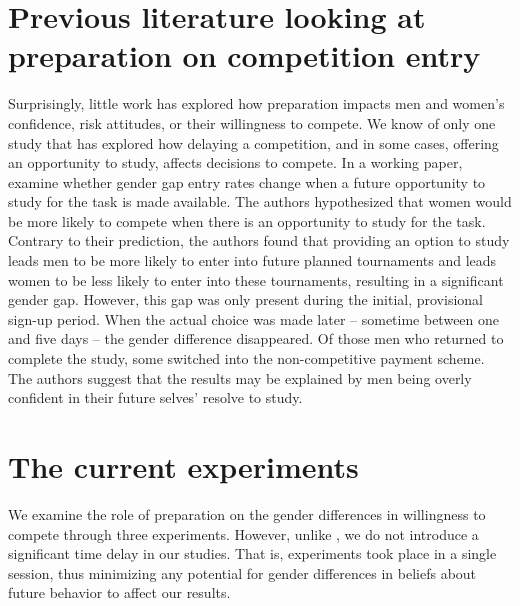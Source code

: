 \documentclass[a4paper,nobind]{templates/ociamthesis}
\begin{document}
\hypertarget{previous-literature-looking-at-preparation-on-competition-entry}{%
\section{Previous literature looking at preparation on competition entry}\label{previous-literature-looking-at-preparation-on-competition-entry}}

Surprisingly, little work has explored how preparation impacts men and women's confidence, risk attitudes, or their willingness to compete. We know of only one study that has explored how delaying a competition, and in some cases, offering an opportunity to study, affects decisions to compete. In a working paper, \textcite{Charness2021} examine whether gender gap entry rates change when a future opportunity to study for the task is made available. The authors hypothesized that women would be more likely to compete when there is an opportunity to study for the task. Contrary to their prediction, the authors found that providing an option to study leads men to be more likely to enter into future planned tournaments and leads women to be less likely to enter into these tournaments, resulting in a significant gender gap. However, this gap was only present during the initial, provisional sign-up period. When the actual choice was made later -- sometime between one and five days -- the gender difference disappeared. Of those men who returned to complete the study, some switched into the non-competitive payment scheme. The authors suggest that the results may be explained by men being overly confident in their future selves' resolve to study.

\hypertarget{the-current-experiments}{%
\section{The current experiments}\label{the-current-experiments}}

We examine the role of preparation on the gender differences in willingness to compete through three experiments. However, unlike \textcite{Charness2021}, we do not introduce a significant time delay in our studies. That is, experiments took place in a single session, thus minimizing any potential for gender differences in beliefs about future behavior to affect our results.
\end{document}
